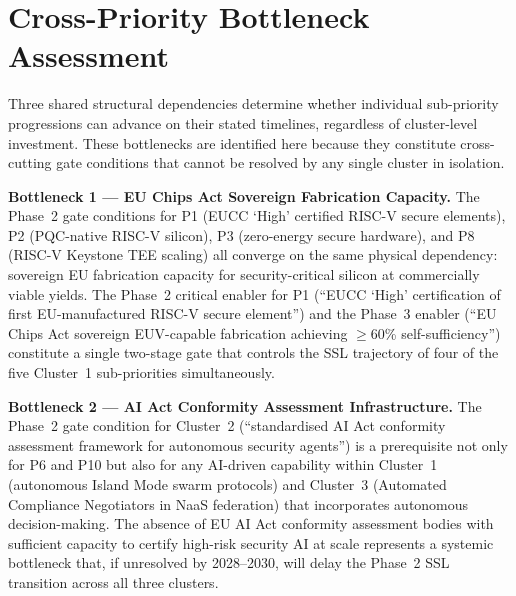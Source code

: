 
\newpage
\section{Cross-Priority Bottleneck Assessment}
\label{sec:bottlenecks}

Three shared structural dependencies determine whether individual sub-priority
progressions can advance on their stated timelines, regardless of cluster-level investment.
These bottlenecks are identified here because they constitute cross-cutting gate conditions
that cannot be resolved by any single cluster in isolation.

\textbf{Bottleneck 1 --- EU Chips Act Sovereign Fabrication Capacity.}
The Phase~2 gate conditions for P1 (EUCC `High' certified RISC-V secure elements),
P2 (PQC-native RISC-V silicon), P3 (zero-energy secure hardware), and P8 (RISC-V
Keystone TEE scaling) all converge on the same physical dependency: sovereign EU
fabrication capacity for security-critical silicon at commercially viable yields.
The Phase~2 critical enabler for P1 (``EUCC `High' certification of first
EU-manufactured RISC-V secure element'') and the Phase~3 enabler (``EU Chips Act
sovereign EUV-capable fabrication achieving $\geq$60\% self-sufficiency'') constitute
a single two-stage gate that controls the SSL trajectory of four of the five Cluster~1
sub-priorities simultaneously.

\textbf{Bottleneck 2 --- AI Act Conformity Assessment Infrastructure.}
The Phase~2 gate condition for Cluster~2 (``standardised AI Act conformity assessment
framework for autonomous security agents'') is a prerequisite not only for P6 and P10
but also for any AI-driven capability within Cluster~1 (autonomous Island Mode swarm
protocols) and Cluster~3 (Automated Compliance Negotiators in NaaS federation) that
incorporates autonomous decision-making. The absence of EU AI Act conformity assessment
bodies with sufficient capacity to certify high-risk security AI at scale represents a
systemic bottleneck that, if unresolved by 2028--2030, will delay the Phase~2 SSL
transition across all three clusters.

